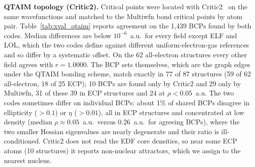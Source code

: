 \textbf{QTAIM topology (Critic2).} Critical points were located with
Critic2~\citep{critic2} on the same wavefunctions and matched to the Multiwfn bond critical
points by atom pair. Table~\ref{tab:xval_qtaim} reports agreement on the 1{,}439 BCPs found
by both codes. Median differences are below $10^{-6}$~a.u.\ for every field except ELF and LOL,
which the two codes define against different uniform-electron-gas references and so differ
by a systematic offset. On the 62 all-electron structures every other field agrees with
$r=1.0000$. The BCP sets themselves, which are the graph edges under the QTAIM bonding
scheme, match exactly in 77 of 87 structures (59 of 62 all-electron, 18 of 25 ECP); 10
BCPs are found only by Critic2 and 29 only by Multiwfn, 31 of these 39 in ECP structures
and 24 at $\rho<0.05$~a.u. The two codes sometimes differ on individual BCPs: about 1\%
of shared BCPs disagree in ellipticity ($>0.1$) or $\eta$ ($>0.01$), all in ECP structures
and concentrated at low density (median $\rho\approx0.05$~a.u.\ versus 0.26~a.u.\ for
agreeing BCPs), where the two smaller Hessian eigenvalues are nearly degenerate and their
ratio is ill-conditioned. Critic2 does not read the EDF core densities, so near some ECP
atoms (10 structures) it reports non-nuclear attractors, which we assign to the nearest
nucleus.

